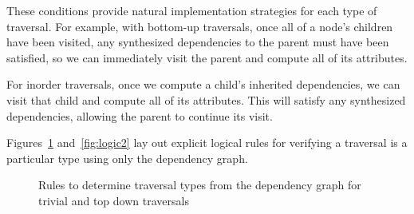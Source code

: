 \documentclass[10pt]{article}
\begin{document}
These conditions provide natural implementation strategies for each type of traversal. For example, with bottom-up traversals, once all of a node's children have been visited, any synthesized dependencies to the parent must have been satisfied, so we can immediately visit the parent and compute all of its attributes.

For inorder traversals, once we compute a child's inherited dependencies, we can visit that child and compute all of its attributes. This will satisfy any synthesized dependencies, allowing the parent to continue its visit.

Figures~\ref{fig:logic1} and~\ref{fig:logic2} lay out explicit logical rules for verifying a traversal is a particular type using only the dependency graph.
\begin{figure}
    \scriptsize
    \begin{prooftree}
    \end{prooftree}
    \begin{prooftree}
    \end{prooftree}
    \begin{prooftree}
    \end{prooftree}
    \begin{prooftree}
    \end{prooftree}


    \begin{prooftree}
    \end{prooftree}
    \begin{prooftree}
    \end{prooftree}
    \begin{prooftree}
    \end{prooftree}
    \begin{prooftree}
    \end{prooftree}
    \begin{prooftree}
    \end{prooftree}

    \caption{Rules to determine traversal types from the dependency graph for trivial and top down traversals}

    \label{fig:logic1}
\end{figure}
\end{document}
